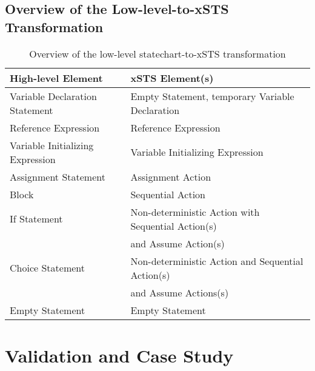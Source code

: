 \section{Overview of the Low-level-to-xSTS Transformation}
\begin{table}[H]
	\centering
	\renewcommand{\arraystretch}{1.5}
	\begin{tabular}{ | l | l |}
		\toprule
		\textbf{High-level Element} & \textbf{xSTS Element(s)} \\ \hline
		\midrule
		Variable Declaration Statement & Empty Statement, temporary Variable Declaration \\ \hline
		Reference Expression & Reference Expression \\ \hline
		Variable Initializing Expression & Variable Initializing Expression \\ \hline
		Assignment Statement & Assignment Action\\ \hline
		Block & Sequential Action \\ \hline
		If Statement & Non-deterministic Action with Sequential Action(s) \\
		& and Assume Action(s) \\ \hline
		Choice Statement & Non-deterministic Action and Sequential Action(s) \\
		& and Assume Actions(s) \\ \hline
		Empty Statement & Empty Statement \\ \hline
		\bottomrule
	\end{tabular}
	\caption{Overview of the low-level statechart-to-xSTS transformation}
	\label{tab:LLXSTSOverview}
\end{table}

\chapter{Validation and Case Study}
\newpage

